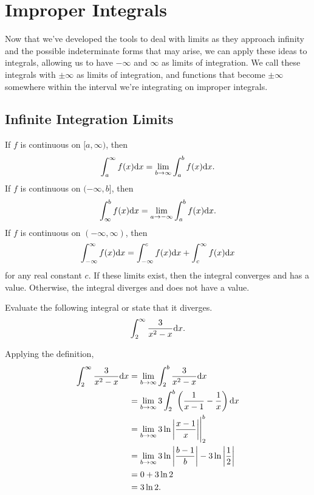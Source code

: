 \section{Improper Integrals}
Now that we've developed the tools to deal with limits as they approach infinity and the possible indeterminate forms that may arise, we can apply these ideas to integrals, allowing us to have $-\infty$ and $\infty$ as limits of integration.
We call these integrals with $\pm\infty$ as limits of integration, and functions that become $\pm\infty$ somewhere within the interval we're integrating on improper integrals.

\subsection{Infinite Integration Limits}
\begin{definition}
	If $f$ is continuous on $[a,\infty)$, then
	\begin{equation*}
		\int_{a}^{\infty}{f(x)\mathrm{d} x} = \lim_{b\to\infty}{\int_{a}^{b}{f(x)\mathrm{d} x}}.
	\end{equation*}
	If $f$ is continuous on $(-\infty,b]$, then
	\begin{equation*}
		\int_{\infty}^{b}{f(x)\mathrm{d} x} = \lim_{a\to-\infty}{\int_{a}^{b}{f(x)\mathrm{d} x}}.
	\end{equation*}
	If $f$ is continuous on $(-\infty,\infty)$, then
	\begin{equation*}
		\int_{-\infty}^{\infty}{f(x)\mathrm{d} x} = \int_{-\infty}^{c}{f(x)\mathrm{d} x} + \int_{c}^{\infty}{f(x)\mathrm{d} x}
	\end{equation*}
	for any real constant $c$.
	If these limits exist, then the integral converges and has a value.
	Otherwise, the integral diverges and does not have a value.
\end{definition}

\begin{example}
	Evaluate the following integral or state that it diverges.
	\begin{equation*}
		\int_{2}^{\infty}{\frac{3}{x^2-x}\mathrm{d} x}.
	\end{equation*}
\end{example}
\begin{answer}
	Applying the definition,
	\begin{align*}
		\int_{2}^{\infty}{\frac{3}{x^2-x}\mathrm{d} x} &= \lim_{b\to\infty}{\int_{2}^{b}{\frac{3}{x^2-x}\mathrm{d} x}} \\
		&= \lim_{b\to\infty}{3\int_{2}^{b}{\left(\frac{1}{x-1}-\frac{1}{x}\right)\mathrm{d} x}} \\
		&= \lim_{b\to\infty}{3\ln{\bigg\lvert\frac{x-1}{x}\bigg\rvert}\Biggr\rvert_{2}^{b}} \\
		&= \lim_{b\to\infty}{3\ln{\bigg\lvert\frac{b-1}{b}\bigg\rvert}} - 3\ln{\bigg\lvert\frac{1}{2}\bigg\rvert} \\
		&= 0 + 3\ln{2} \\
		&= 3\ln{2}.
	\end{align*}
\end{answer}


